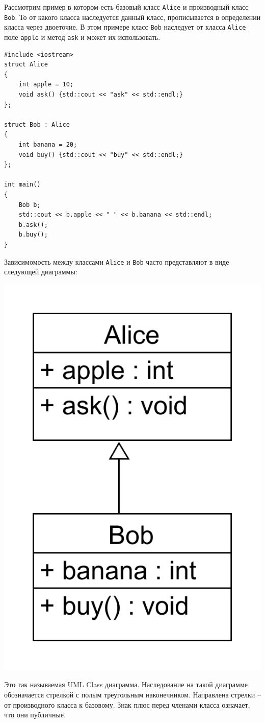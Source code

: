 \documentclass{article}
\begin{document}
Рассмотрим пример в котором есть базовый класс \texttt{Alice} и производный класс \texttt{Bob}. То от какого класса наследуется данный класс, прописывается в определении класса через двоеточие. В этом примере класс \texttt{Bob} наследует от класса \texttt{Alice} поле \texttt{apple} и метод \texttt{ask} и может их использовать.
\begin{lstlisting}
#include <iostream>
struct Alice
{
    int apple = 10;
    void ask() {std::cout << "ask" << std::endl;}
};

struct Bob : Alice
{
    int banana = 20;
    void buy() {std::cout << "buy" << std::endl;}
};

int main()
{
    Bob b;
    std::cout << b.apple << " " << b.banana << std::endl;
    b.ask();
    b.buy();
}
\end{lstlisting}
Зависимомость между классами \texttt{Alice} и \texttt{Bob} часто представляют в виде следующей диаграммы:
\begin{center}
\includegraphics[scale=0.18]{../images/alice_bob.png}
\end{center}
Это так называемая UML Class диаграмма. Наследование на такой диаграмме обозначается стрелкой с полым треугольным наконечником. Направлена стрелки -- от производного класса к базовому. Знак плюс перед членами класса означает, что они публичные.
\end{document}
